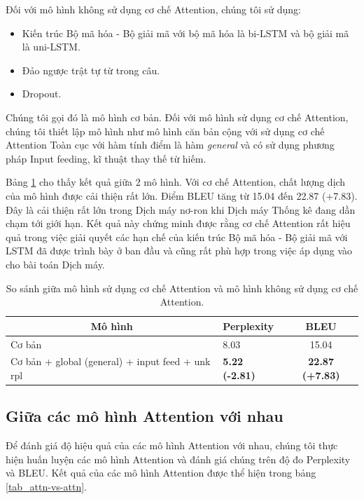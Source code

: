 Đối với mô hình không sử dụng cơ chế Attention, chúng tôi sử dụng: 
\begin{itemize}
	\item Kiến trúc Bộ mã hóa - Bộ giải mã với bộ mã hóa là bi-LSTM và bộ giải mã là uni-LSTM.
	\item Đảo ngược trật tự từ trong câu.
	\item Dropout.
\end{itemize}
Chúng tôi gọi đó là mô hình cơ bản. Đối với mô hình sử dụng cơ chế Attention, chúng tôi thiết lập mô hình như mô hình căn bản cộng với sử dụng cơ chế Attention Toàn cục với hàm tính điểm là hàm \textit{general} và có sử dụng phương pháp Input feeding, kĩ thuật thay thế từ hiếm.

Bảng \ref{tab_non-attn_vs_attn} cho thấy kết quả giữa 2 mô hình. Với cơ chế Attention, chất lượng dịch của mô hình được cải thiện rất lớn. Điểm BLEU tăng từ 15.04 đến 22.87 (+7.83). Đây là cải thiện rất lớn trong Dịch máy nơ-ron khi Dịch máy Thống kê đang dần chạm tới giới hạn. Kết quả này chứng minh được rằng cơ chế Attention rất hiệu quả trong việc giải quyết các hạn chế của kiến trúc Bộ mã hóa - Bộ giải mã với LSTM đã được trình bày ở ban đầu và cũng rất phù hợp trong việc áp dụng vào cho bài toán Dịch máy.

\begin{table}
	\centering
	\begin{tabular}{|l|l|c|} 
		\hline
		\multicolumn{1}{|c|}{ \textbf{Mô hình} }         & \textbf{Perplexity}  & \textbf{BLEU}   \\ 
		\hline
		Cơ bản                                           & 8.03                 & 15.04           \\ 
		\hline
		Cơ bản + global (general) + input feed + unk rpl & \textbf{5.22 (-2.81)}         & \textbf{22.87 (+7.83)}   \\
		\hline
	\end{tabular}
	\caption{So sánh giữa mô hình sử dụng cơ chế Attention và mô hình không sử dụng cơ chế Attention.}
	\label{tab_non-attn_vs_attn}
\end{table}

\subsection{Giữa các mô hình Attention với nhau}
Để đánh giá độ hiệu quả của các mô hình Attention với nhau, chúng tôi thực hiện huấn luyện các mô hình Attention và đánh giá chúng trên độ đo Perplexity và BLEU. Kết quả của các mô hình Attention được thể hiện trong bảng \ref{tab_attn-vs-attn}. 

